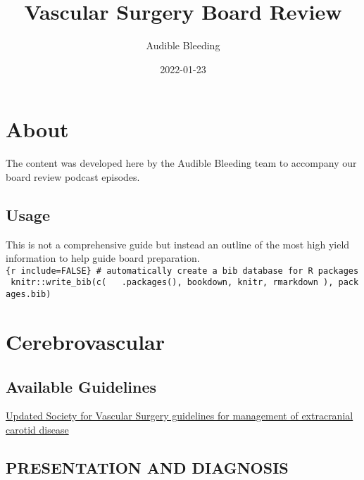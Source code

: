 \documentclass[
]{book}
\title{Vascular Surgery Board Review}
\author{Audible Bleeding}
\date{2022-01-23}
\theoremstyle{definition}
\theoremstyle{definition}
\theoremstyle{definition}
\theoremstyle{definition}
\theoremstyle{remark}
\begin{document}
\maketitle

{
\setcounter{tocdepth}{1}
\tableofcontents
}
\hypertarget{about}{%
\chapter{About}\label{about}}

The content was developed here by the Audible Bleeding team to accompany our board review podcast episodes.

\hypertarget{usage}{%
\section{Usage}\label{usage}}

This is not a comprehensive guide but instead an outline of the most high yield information to help guide board preparation.\texttt{\{r\ include=FALSE\}\ \#\ automatically\ create\ a\ bib\ database\ for\ R\ packages\ knitr::write\_bib(c(\ \ \ .packages(),\ \textquotesingle{}bookdown\textquotesingle{},\ \textquotesingle{}knitr\textquotesingle{},\ \textquotesingle{}rmarkdown\textquotesingle{}\ ),\ \textquotesingle{}packages.bib\textquotesingle{})}

\hypertarget{cerebrovascular}{%
\chapter{Cerebrovascular}\label{cerebrovascular}}

\hypertarget{available-guidelines}{%
\section{Available Guidelines}\label{available-guidelines}}

\href{https://www.jvascsurg.org/article/S0741-5214\%2811\%2901635-1/fulltext}{Updated Society for Vascular Surgery guidelines for management of extracranial carotid disease}

\hypertarget{presentation-and-diagnosis}{%
\section{PRESENTATION AND DIAGNOSIS}\label{presentation-and-diagnosis}}
\end{document}
